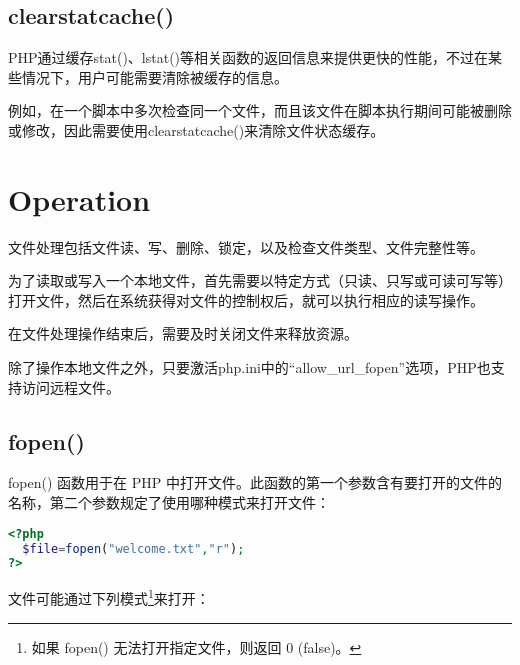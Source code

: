 \subsection{clearstatcache()}


PHP通过缓存stat()、lstat()等相关函数的返回信息来提供更快的性能，不过在某些情况下，用户可能需要清除被缓存的信息。


例如，在一个脚本中多次检查同一个文件，而且该文件在脚本执行期间可能被删除或修改，因此需要使用clearstatcache()来清除文件状态缓存。

\section{Operation}


文件处理包括文件读、写、删除、锁定，以及检查文件类型、文件完整性等。


为了读取或写入一个本地文件，首先需要以特定方式（只读、只写或可读可写等）打开文件，然后在系统获得对文件的控制权后，就可以执行相应的读写操作。


在文件处理操作结束后，需要及时关闭文件来释放资源。


除了操作本地文件之外，只要激活php.ini中的“allow\_url\_fopen”选项，PHP也支持访问远程文件。





\subsection{fopen()}




fopen() 函数用于在 PHP 中打开文件。此函数的第一个参数含有要打开的文件的名称，第二个参数规定了使用哪种模式来打开文件：

\begin{lstlisting}[language=PHP]
<?php
  $file=fopen("welcome.txt","r");
?>
\end{lstlisting}

文件可能通过下列模式\footnote{如果 fopen() 无法打开指定文件，则返回 0 (false)。}来打开：



